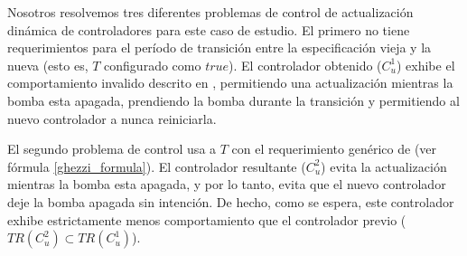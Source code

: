 Nosotros resolvemos tres diferentes problemas de control de actualización dinámica de controladores para este caso de
estudio. El primero no tiene requerimientos para el período de transición entre la especificación vieja y la nueva (esto
es, $T$ configurado como $true$). El controlador obtenido ($C^1_u$) exhibe el comportamiento invalido descrito en
\cite{PanzicaLaManna:2013:FCC:2487336.2487349}, permitiendo una actualización mientras la bomba esta apagada, prendiendo
la bomba durante la transición y permitiendo al nuevo controlador a nunca reiniciarla.

El segundo problema de control usa a $T$ con el requerimiento genérico de \cite{6224401} (ver fórmula
\ref{ghezzi_formula}). El controlador resultante ($C^2_u$) evita la actualización mientras la bomba esta apagada, y por lo
tanto, evita que el nuevo controlador deje la bomba apagada sin intención. De hecho, como se espera, este controlador
exhibe estrictamente menos comportamiento que el controlador previo ($TR(C^2_u) \subset TR(C^1_u)$).




